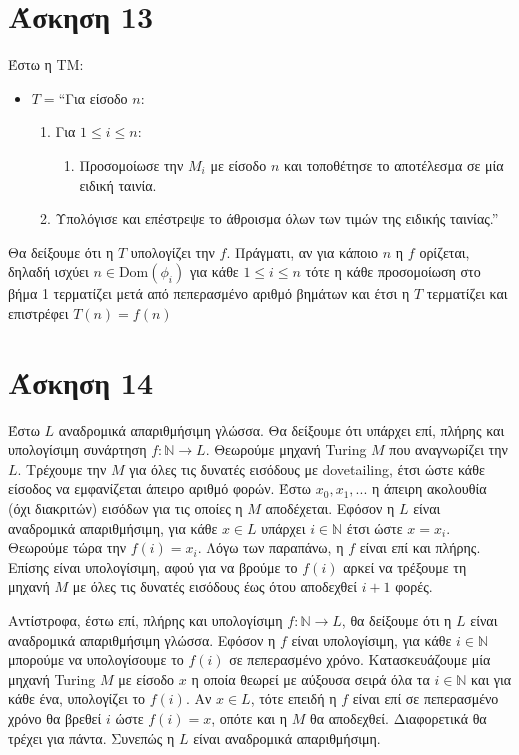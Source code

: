 \documentclass[a4paper, oneside, 11pt]{article}
\theoremstyle{definition}
\begin{document}
\section*{Άσκηση 13}

Έστω η ΤΜ:

\begin{itemize}
\item $T = $``Για είσοδο $n$:
      \begin{enumerate}
      \item Για $1 \leq i \leq n$:
            \begin{enumerate}
            \item Προσομοίωσε την $M_i$ με είσοδο $n$ και τοποθέτησε το αποτέλεσμα σε
                  μία ειδική ταινία.
            \end{enumerate}
      \item Υπολόγισε και επέστρεψε το άθροισμα όλων των τιμών της ειδικής ταινίας.''
      \end{enumerate}
\end{itemize}

Θα δείξουμε ότι η $T$ υπολογίζει την $f$. Πράγματι, αν για κάποιο $n$ η $f$ ορίζεται,
δηλαδή ισχύει
$n \in \text{Dom}(\phi_i)$ για κάθε $1 \leq i \leq n$ τότε η 
κάθε προσομοίωση στο βήμα 1 τερματίζει μετά από πεπερασμένο αριθμό βημάτων και έτσι η
$T$ τερματίζει και επιστρέφει $T(n) = f(n)$

\section*{Άσκηση 14}

Έστω $L$ αναδρομικά απαριθμήσιμη γλώσσα. Θα δείξουμε ότι υπάρχει επί, πλήρης και υπολογίσιμη
συνάρτηση $f:\mathbb{N}\rightarrow L$. Θεωρούμε μηχανή Turing $M$ που αναγνωρίζει την $L$.
Τρέχουμε την $M$ για όλες τις δυνατές εισόδους με dovetailing, έτσι ώστε κάθε είσοδος να εμφανίζεται
άπειρο αριθμό φορών. Έστω $x_0, x_1, ... $ η άπειρη
ακολουθία (όχι διακριτών) εισόδων για τις οποίες η $M$ αποδέχεται. Εφόσον η $L$ είναι
αναδρομικά απαριθμήσιμη, για κάθε $x\in L$ υπάρχει $i\in \mathbb{N}$ έτσι ώστε $x=x_i$.
Θεωρούμε τώρα την $f(i) = x_i$. Λόγω των παραπάνω, η $f$ είναι επί και πλήρης. Επίσης είναι
υπολογίσιμη, αφού για να βρούμε το $f(i)$ αρκεί να τρέξουμε τη μηχανή $M$ με όλες τις δυνατές
εισόδους έως ότου αποδεχθεί $i+1$ φορές. 

Αντίστροφα, έστω επί, πλήρης και υπολογίσιμη $f:\mathbb{N}\rightarrow L$, θα δείξουμε ότι η $L$
είναι αναδρομικά απαριθμήσιμη γλώσσα. Εφόσον η $f$ είναι υπολογίσιμη, για κάθε $i\in \mathbb{N}$
μπορούμε να υπολογίσουμε το $f(i)$ σε πεπερασμένο χρόνο. Κατασκευάζουμε μία μηχανή Turing $M$
με είσοδο $x$ η οποία θεωρεί με αύξουσα σειρά όλα τα $i\in \mathbb{N}$ και για κάθε ένα, 
υπολογίζει το $f(i)$. Αν $x\in L$, τότε επειδή η $f$ είναι επί σε πεπερασμένο χρόνο 
θα βρεθεί $i$ ώστε $f(i)=x$, οπότε και
η $M$ θα αποδεχθεί. Διαφορετικά θα τρέχει για πάντα. Συνεπώς η $L$ είναι αναδρομικά απαριθμήσιμη.
\end{document}
